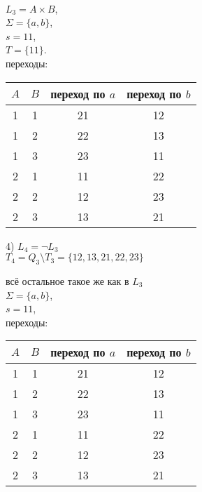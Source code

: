 \documentclass[a4paper,12pt]{article}
\begin{document}
        
\\


$L_3=A \times B$, \\
$\Sigma=\{a,b\}$, \\
$s=11$,\\
$T=\{11\}$. \\
переходы:\\
\begin{center}
    \begin{tabular}{ |c|c|c|c| } 
        \hline
        $A$ & $B$ & переход по $a$ & переход по $b$ \\
        \hline
        1 & 1 & 21 & 12 \\
        \hline
        1 & 2 & 22 & 13 \\
        \hline
        1 & 3 & 23 & 11 \\
        \hline
        2 & 1 & 11 & 22 \\
        \hline
        2 & 2 & 12 & 23 \\
        \hline
        2 & 3 & 13 & 21 \\
        \hline
    \end{tabular}
\end{center}

 



4)  $L_4= \neg L_3 $ \\

$T_4= Q_3 \setminus T_3 = \{ 12, 13, 21, 22, 23 \} $

всё остальное такое же как в $L_3$\\

$\Sigma=\{a,b\}$, \\
$s=11$,\\
переходы:\\
\begin{center}
    \begin{tabular}{ |c|c|c|c| } 
        \hline
        $A$ & $B$ & переход по $a$ & переход по $b$ \\
        \hline
        1 & 1 & 21 & 12 \\
        \hline
        1 & 2 & 22 & 13 \\
        \hline
        1 & 3 & 23 & 11 \\
        \hline
        2 & 1 & 11 & 22 \\
        \hline
        2 & 2 & 12 & 23 \\
        \hline
        2 & 3 & 13 & 21 \\
        \hline
    \end{tabular}
\end{center}
\end{document}
